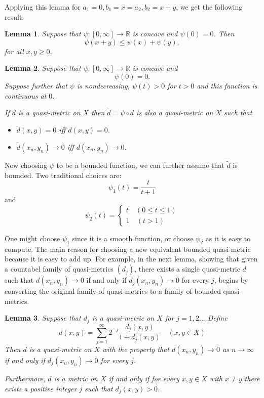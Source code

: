 \documentclass{article} %
\newtheorem{lemma}{Lemma}
\begin{document}
Applying this lemma for $a_1 =0, b_1=x = a_2, b_2=x+y$, we get the following result:
\begin{lemma}
    Suppose that $\psi \colon [0,\infty] \to \mathbb{R}$ is concave and $\psi(0)=0$. Then
    \[ \psi(x+y) \le \psi(x) + \psi(y),\]
    for all $x,y \ge 0$.
\end{lemma}
\begin{lemma}
    Suppose that $\psi \colon [0,\infty] \to \mathbb{R}$ is concave and
    \[\psi(0)=0.\]
    Suppose further that $\psi$ is nondecreasing, $\psi(t) >0$ for $t >0$ and this function is continuous at $0$.

    If $d$ is a quasi-metric on $X$ then $\tilde{d} = \psi \circ d$ is also a quasi-metric on $X$
    such that
    \begin{itemize}
        \item $\tilde{d}(x,y)=0$ iff $d(x,y)=0$.
        \item $\tilde{d}(x_n,y_n) \to 0$ iff $d(x_n,y_n) \to 0$.
    \end{itemize}
\end{lemma}
Now choosing $\psi$ to be a bounded function, we can further assume that $\tilde{d}$ is bounded. Two traditional choices are:
\[ \psi_1(t)= \dfrac{t}{t+1}\]
and
\[\psi_2(t) = \begin{cases}
        t \quad (0 \le t \le 1) \\
        1 \quad (t >1)
    \end{cases}\]

One might choose $\psi_1$ since it is a smooth function, or choose $\psi_2$ as it is easy to compute.
The main reason for choosing a new equivalent bounded quasi-metric because it is easy to add up.
For example, in the next lemma, showing that given a countabel family of quasi-metrics $(d_j)$, there exists a single quasi-metric $d$
such that $d(x_n,y_n) \to 0$  if and only if $d_j(x_n,y_n) \to 0$ for every $j$, begins by converting the original family of quasi-metrics to a family of bounded quasi-metrics.

\begin{lemma}
    Suppose that $d_j$ is a quasi-metric on $X$ for $j =1,2\ldots$ Define
    \[d(x,y) = \sum_{j=1}^\infty 2^{-j}\dfrac{d_j(x,y)}{1+d_j(x,y)} \quad (x,y \in X)\]
    Then $d$ is a quasi-metric on $X$ with the property that $d(x_n,y_n) \to 0$ as $n \to \infty$
    if and only if $d_j(x_n,y_n) \to 0$ for every $j$.

    Furthermore, $d$ is a metric on $X$ if and only if for every $x,y \in X$ with $x \ne y$ there exists a positive integer $j$ such that $d_j(x,y)>0$.
\end{lemma}
\end{document}
